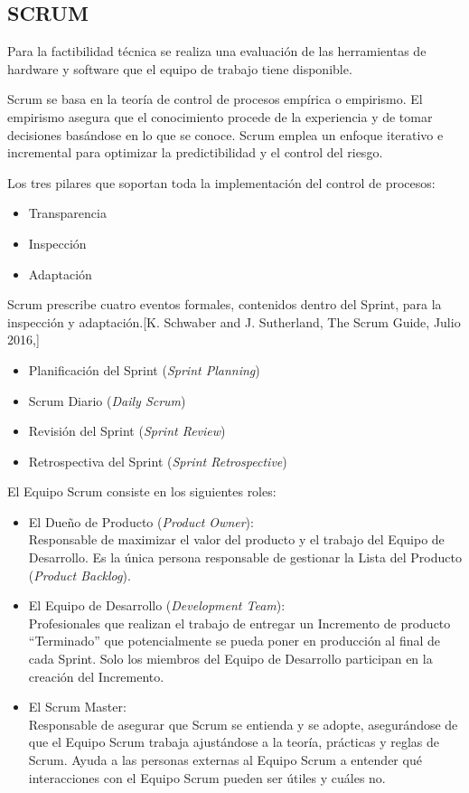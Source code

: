 \subsection{SCRUM}
Para la factibilidad técnica se realiza una evaluación de las herramientas de hardware  y software que el equipo de trabajo tiene disponible.

Scrum se basa en la teoría de control de procesos empírica o empirismo. El empirismo asegura que el conocimiento procede de la experiencia y de tomar decisiones basándose en lo que se conoce. Scrum emplea un enfoque iterativo e incremental para optimizar la predictibilidad y el control del riesgo.

\noindent Los tres pilares que soportan toda la implementación del control de procesos:
\begin{itemize}
	\item Transparencia
	\item Inspección
	\item Adaptación
\end{itemize}

\noindent Scrum prescribe cuatro eventos formales, contenidos dentro del Sprint, para la inspección y adaptación.[K. Schwaber and J. Sutherland, The Scrum Guide, Julio 2016,]
\begin{itemize}
	\item Planificación del Sprint (\textit{Sprint Planning})
	\item Scrum Diario (\textit{Daily Scrum})
	\item Revisión del Sprint (\textit{Sprint Review})
	\item Retrospectiva del Sprint (\textit{Sprint Retrospective})
\end{itemize}

\noindent El Equipo Scrum consiste en los siguientes roles:
\begin{itemize}
	\item El Dueño de Producto (\textit{Product Owner}):\\
	Responsable de maximizar el valor del producto y el trabajo del Equipo de Desarrollo. Es la única persona responsable de gestionar la Lista del Producto (\textit{Product Backlog}).
	\item El Equipo de Desarrollo (\textit{Development Team}):\\
	Profesionales que realizan el trabajo de entregar un Incremento de producto “Terminado” que potencialmente se pueda poner en producción al final de cada Sprint. Solo los miembros del Equipo de Desarrollo participan en la creación del Incremento.
	\item  El Scrum Master:\\
	Responsable de asegurar que Scrum se entienda y se adopte, asegurándose de que el Equipo Scrum trabaja ajustándose a la teoría, prácticas y reglas de Scrum. Ayuda a las personas externas al Equipo Scrum a entender qué interacciones con el Equipo Scrum pueden ser útiles y cuáles no.
\end{itemize}


